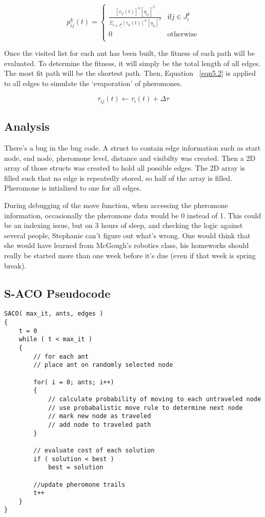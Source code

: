 \begin{equation} \label{eqn5.5}
p_{ij}^{k}(t) = 
	\begin{cases}
	\frac{ [\tau_{ij}(t)]^\alpha [\eta_{ij}]^\beta} {\Sigma_{l \in J_i^k}[\tau_{il}(t)]^\alpha[\eta_{il}]^\beta } & \text{if} j \in J_i^k \\
	0 	& \text{otherwise} \\
	\end{cases}
\end{equation}

Once the visited list for each ant has been built, the fitness of each path will be evaluated. To determine the fitness, it will simply be the total length of all edges. The most fit path will be the shortest path. Then, Equation ~\ref{eqn5.2} is applied to all edges to simulate the `evaporation' of pheromones. 

\begin{equation} \label{eqn5.2}
\tau_{ij}(t) \leftarrow \tau_i(t) + \Delta \tau
\end{equation}

\subsection{Analysis}
There's a bug in the bug code. A struct to contain edge information such as start node, end node, pheromone level, distance and visibilty was created. Then a 2D array of those structs was created to hold all possible edges. The 2D array is filled such that no edge is repeatedly stored, so half of the array is filled. Pheromone is intialized to one for all edges. 

During debugging of the move function, when accessing the pheromone information, occasionally the pheromone data would be 0 instead of 1. This could be an indexing issue, but on 3 hours of sleep, and checking the logic against several people, Stephanie can't figure out what's wrong. One would think that she would have learned from McGough's robotics class, his homeworks should really be started more than one week before it's due (even if that week is spring break).

\subsection{ S-ACO Pseudocode } \label{acoPseudo}
\begin{lstlisting}
SACO( max_it, ants, edges )
{
	t = 0
	while ( t < max_it )
	{
		// for each ant
		// place ant on randomly selected node
		
		for( i = 0; ants; i++)
		{
			// calculate probability of moving to each untraveled node
			// use probabalistic move rule to determine next node
			// mark new node as traveled
			// add node to traveled path
		}
		
		// evaluate cost of each solution
		if ( solution < best )
			best = solution

		//update pheromone trails
		t++
	}
}
\end{lstlisting}


